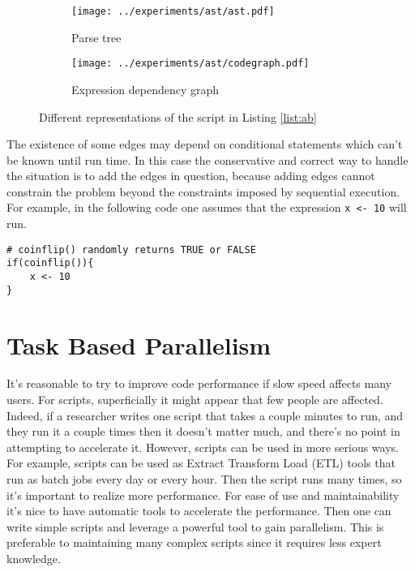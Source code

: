 \documentclass[12pt]{article}
\begin{document}


\begin{figure}
\centering
\begin{subfigure}{.6\textwidth}
    \centering
    \texttt{[image: ../experiments/ast/ast.pdf]}
    \caption{Parse tree}
    \label{fig:ast}
\end{subfigure}%
\begin{subfigure}{.4\textwidth}
  \centering
  \texttt{[image: ../experiments/ast/codegraph.pdf]}
  \caption{Expression dependency graph}
  \label{fig:codegraph}
\end{subfigure}
\caption{Different representations of the script in Listing \ref{list:ab}}
\end{figure}

The existence of some edges may depend on conditional statements which can't
be known until run time. In this case the conservative and correct way to
handle the situation is to add the edges in question, because adding edges
cannot constrain the problem beyond the constraints imposed by sequential
execution. For example, in the following code one assumes that the
expression \texttt{x <- 10} will run.

\begin{verbatim}
# coinflip() randomly returns TRUE or FALSE
if(coinflip()){
    x <- 10
}
\end{verbatim}

\section{Task Based Parallelism}

It's reasonable to try to improve code performance if slow speed affects
many users. For scripts, superficially it might appear that few people are
affected. Indeed, if a researcher writes one script that takes a couple
minutes to run, and they run it a couple times then it doesn't matter much,
and there's no point in attempting to accelerate it.  However, 
scripts can be used in more serious ways.  For example, scripts
can be used as Extract Transform Load (ETL) tools that run as batch jobs
every day or every hour. Then the script runs many times, so it's important
to realize more performance. For ease of use and maintainability it's nice
to have automatic tools to accelerate the performance. Then one can write
simple scripts and leverage a powerful tool to gain parallelism. This is
preferable to maintaining many complex scripts since it requires less
expert knowledge.
\end{document}
